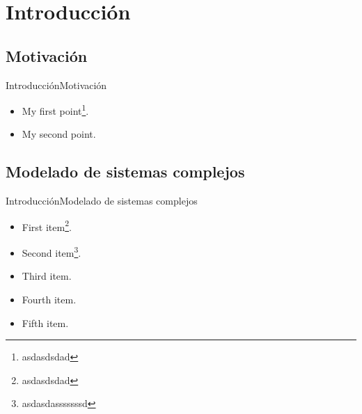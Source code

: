 \section{Introducción}

\subsection{Motivación}

\begin{frame}{Introducción}{Motivación}
  \begin{itemize}
  \item {
    My first point\footnote{asdasdsdad}.
  }
  \item {
    My second point.
  }
  \end{itemize}
\end{frame}

\subsection{Modelado de sistemas complejos}

\begin{frame}{Introducción}{Modelado de sistemas complejos}
  \begin{itemize}
  \item {
    First item\footnote{asdasdsdad}.
    \pause %
  }
  \item {   
    Second item\footnote{asdasdasssssssd}.
  }
  \item<3-> {
    Third item.
  }
  \item<4-> {
    Fourth item.
  }
  \item<5-> {
    Fifth item. 
  }
  \end{itemize}
\end{frame}